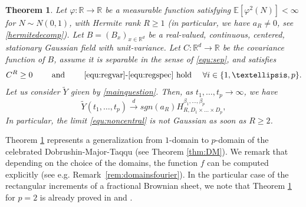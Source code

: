 \documentclass[12pt]{article}
\DeclareMathOperator{\1}{1}
\newcommand{\R}{\mathbb{R}}
\newcommand{\E}{\mathbb{E}}
\newcommand{\f}{\varphi}
\theoremstyle{plain}
\newtheorem{theorem}{Theorem}
\theoremstyle{definition}
\begin{document}
{
\begin{theorem}\label{thm:main 2}
Let $\f:\R \rightarrow \R$ be a measurable function satisfying $\E[\varphi^2(N)]<\infty$ for $N\sim N(0,1)$, with Hermite rank $R\geq 1$ (in particular, we have $a_R\neq0$, see \eqref{hermitedecomp}).
Let $B=(B_x)_{x\in\R^d}$ be a real-valued, continuous, centered, stationary Gaussian field with unit-variance. 
Let $C:\R^d \rightarrow \R$ be the covariance function of $B$, assume it is separable in the sense of \eqref{equ:sep}, and satisfies 
\[
C^R\ge0 \quad\quad\text{ and }\quad \quad\text{\eqref{equ:regvar}-\eqref{equ:regspec} hold $\quad\forall i\in \{1,\ldots,p\}$.}
\]
Let us consider $\widetilde Y$ given by \eqref{mainquestion}. 
Then, as $t_1,\ldots,t_p\rightarrow\infty$, we have 
\begin{equation}\label{equ:noncentral}
             \widetilde{Y}(t_1,\ldots,t_p)\overset{d}{\longrightarrow} sgn(a_R) H^{\beta_1,\ldots,\beta_p}_{R,D_1\times\ldots\times D_p},
         \end{equation}
      In particular, the limit \eqref{equ:noncentral} is not Gaussian as soon as $R\ge2$.
 \end{theorem}
 }
 
Theorem \ref{thm:main 2} represents a generalization from $1$-domain to $p$-domain of the celebrated Dobrushin-Major-Taqqu (see Theorem \ref{thm:DM}). We remark that depending on the choice of the domains, the function $f$ can be computed explicitly (see e.g. Remark~\ref{rem:domainsfourier}).
In the particular case of the rectangular increments of a fractional Brownian sheet,
we note that Theorem \ref{thm:main 2} for $p=2$ is already proved in \cite{RST} and \cite{PR16}. 

\vspace{0.25cm}
\end{document}

